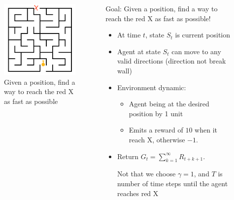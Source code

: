 \documentclass[10pt]{beamer}
\theoremstyle{remark}
\begin{document}
\begin{frame}
    \begin{columns}
    \begin{column}{0.4\textwidth}
        \begin{figure}
            \includegraphics[width=\textwidth]{figures/maze.png}
            \caption{Given a position, find a way to reach the  red X as fast as possible}
        \end{figure}
    \end{column}
    \begin{column}{0.7\textwidth}  %
        Goal: Given a position, find a way to reach the red X {\color{red} as fast as possible!}

        \begin{itemize}
            \item At time $t$, state $S_t$ is current position
            \item Agent at state $S_t$ can move to any valid directions (direction not break wall)
            \item Environment dynamic: 
                \begin{itemize}
                    \item Agent being at the desired position by 1 unit 
                    \item Emits a reward of $10$ when it reach X, {\color{red} otherwise $-1$}.
                \end{itemize}
            \item Return $G_t = \sum^{\infty}_{k=1} R_{t+k+1}$.

            Not that we choose $\gamma = 1$, and $T$ is number of time steps until the agent reaches \color{red} red X
        \end{itemize}
    \end{column}
    \end{columns}
\end{frame}
\end{document}

